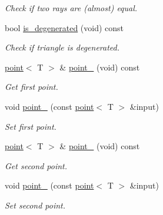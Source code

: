 \begin{DoxyCompactItemize}
\begin{DoxyCompactList}\small\item\em Check if two rays are (almost) equal. \end{DoxyCompactList}\item 
\mbox{\label{classddd_1_1triangle_a9715f8f90cba08549ee91b29552cbfab}} 
bool \hyperlink{classddd_1_1triangle_a9715f8f90cba08549ee91b29552cbfab}{is\+\_\+degenerated} (void) const
\begin{DoxyCompactList}\small\item\em Check if triangle is degenerated. \end{DoxyCompactList}\item 
\mbox{\label{classddd_1_1triangle_a90187bc680868485f09b073757770324}} 
\hyperlink{classddd_1_1point}{point}$<$ T $>$ \& \hyperlink{classddd_1_1triangle_a90187bc680868485f09b073757770324}{point\+\_} (void) const
\begin{DoxyCompactList}\small\item\em Get first point. \end{DoxyCompactList}\item 
void \hyperlink{classddd_1_1triangle_af8c30b97314cd78877330b80e2139612}{point\+\_} (const \hyperlink{classddd_1_1point}{point}$<$ T $>$ \&input)
\begin{DoxyCompactList}\small\item\em Set first point. \end{DoxyCompactList}\item 
\mbox{\label{classddd_1_1triangle_ad7480c02553761f0fbb7ccd5310eb98b}} 
\hyperlink{classddd_1_1point}{point}$<$ T $>$ \& \hyperlink{classddd_1_1triangle_ad7480c02553761f0fbb7ccd5310eb98b}{point\+\_} (void) const
\begin{DoxyCompactList}\small\item\em Get second point. \end{DoxyCompactList}\item 
void \hyperlink{classddd_1_1triangle_a700e0229138322947ad2c0e4c57c285d}{point\+\_} (const \hyperlink{classddd_1_1point}{point}$<$ T $>$ \&input)
\begin{DoxyCompactList}\small\item\em Set second point. \end{DoxyCompactList}\item 

\end{DoxyCompactItemize}
